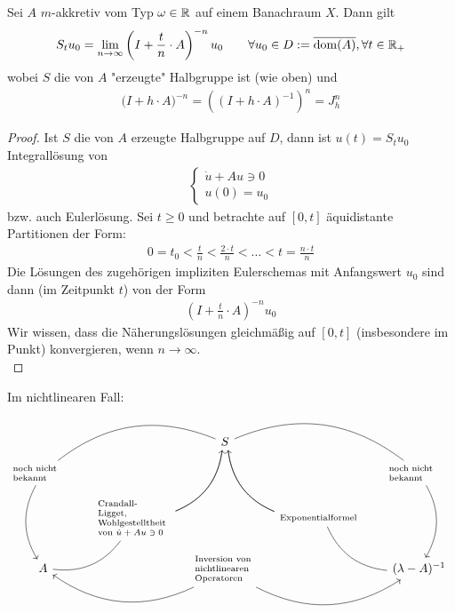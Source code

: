 \begin{theorem}[Exponentialformel]\label{theoremExponentialformel}\enter
	Sei $A$ $m$-akkretiv vom Typ $\omega\in\mathbb{R}$ auf einem Banachraum $X$. 
	Dann gilt
	\begin{align*}
		S_t u_0=\lim\limits_{n\to\infty}\left(I+\frac{t}{n}\cdot A\right)^{-n}u_0\qquad\forall u_0\in D:=\overline{\operatorname{dom}(A)},\forall t\in\mathbb{R}_+
	\end{align*}
	wobei $S$ die von $A$ "erzeugte" Halbgruppe ist (wie oben) und
	\begin{align*}
		\big(I+h\cdot A\big)^{-n}=\left((I+h\cdot A)^{-1}\right)^n=J_h^n
	\end{align*}
\end{theorem}

\begin{proof}
	Ist $S$ die von $A$ erzeugte Halbgruppe auf $D$, dann ist $u(t)=S_t u_0$ Integrallösung von
	\begin{align*}
		\left\lbrace\begin{array}{r}
			\dot{u}+Au\ni 0\\
			u(0)=u_0
		\end{array}\right.
	\end{align*}
	bzw. auch Eulerlösung. 
	Sei $t\geq0$ und betrachte auf $[0,t]$ äquidistante Partitionen der Form:
	\begin{align*}
		0=t_0<\frac{t}{n}<\frac{2\cdot t}{n}<\ldots<t=\frac{n\cdot t}{n}
	\end{align*}
	Die Lösungen des zugehörigen impliziten Eulerschemas mit Anfangswert $u_0$ sind dann (im Zeitpunkt $t$) von der Form 
	\begin{align*}
		\left(I+\frac{t}{n}\cdot A\right)^{-n} u_0
	\end{align*}
	Wir wissen, dass die Näherungslösungen gleichmäßig auf $[0,t]$ (insbesondere im Punkt) konvergieren, wenn $n\to\infty$.\\
\end{proof}

Im nichtlinearen Fall:
$$
\begin{tikzcd}[sep=small]
	& & S \arrow[drr, dash, bend left] \arrow[ddr, dash, bend right] \arrow[ddl, dash, bend left] \arrow[dll, dash, bend right]
	& & \\
	\parbox{50pt}{\scriptsize noch nicht\\ bekannt} 
	\arrow[dd, bend right]
	& & & 
	& \parbox{50pt}{\scriptsize noch nicht\\ bekannt}
	\arrow[dd, bend left]	\\
	&\parbox{60pt}{\scriptsize Crandall-\\Ligget,\\Wohlgestelltheit\\ von $\dot{u}+Au\ni0$} 
	\arrow[uur, bend right]
	& 
	&\parbox{70pt}{\scriptsize Exponentialformel}
	\arrow[uul, bend left]
	\\
	A \arrow[ur, dash, bend right] & & \arrow[ll, bend left] \parbox{50pt}{\scriptsize Inversion von\\ nichtlinearen\\Operatoren} \arrow[rr, bend right]& 
	& (\lambda - A)^{-1} \arrow[ul, dash, bend left]
\end{tikzcd}
$$
